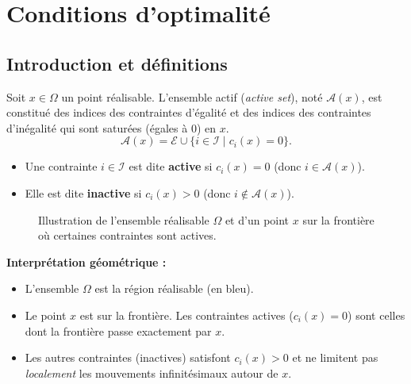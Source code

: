 \chapter{Conditions d'optimalité}
\label{chap:optimality-conditions}

\section{Introduction et définitions}

\begin{definition}
Soit $x \in \Omega$ un point réalisable. L'ensemble actif (\textit{active set}), noté $\mathcal{A}(x)$, est constitué des indices des contraintes d'égalité et des indices des contraintes d'inégalité qui sont saturées (égales à 0) en $x$.
\[
    \mathcal{A}(x) = \mathcal{E} \cup \{ i \in \mathcal{I} \mid c_i(x) = 0 \}.
\]
\begin{itemize}
    \item Une contrainte $i \in \mathcal{I}$ est dite \textbf{active} si $c_i(x) = 0$ (donc $i \in \mathcal{A}(x)$).
    \item Elle est dite \textbf{inactive} si $c_i(x) > 0$ (donc $i \notin \mathcal{A}(x)$).
\end{itemize}
\end{definition}

\begin{figure}[H]
\centering
{}
\caption{Illustration de l'ensemble réalisable $\Omega$ et d'un point $x$ sur la frontière où certaines contraintes sont actives.}
\label{fig:active-set}
\end{figure}

\begin{figureexplanation}
\textbf{Interprétation géométrique :}
\begin{itemize}
    \item L'ensemble $\Omega$ est la région réalisable (en bleu).
    \item Le point $x$ est sur la frontière. Les contraintes actives ($c_i(x)=0$) sont celles dont la frontière passe exactement par $x$.
    \item Les autres contraintes (inactives) satisfont $c_i(x) > 0$ et ne limitent pas \emph{localement} les mouvements infinitésimaux autour de $x$.
\end{itemize}
\end{figureexplanation}

